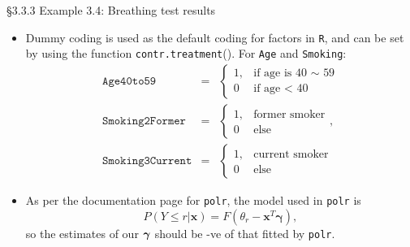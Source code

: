 \documentclass{beamer}
\newcommand{\boldgamma}{{\boldsymbol \gamma}}
\begin{document}
\begin{frame}{\S3.3.3 Example 3.4: Breathing test results  }
\begin{itemize}

\item
Dummy coding is used as the default coding for factors in \texttt{R}, and  can be set by using the function \texttt{contr.treatment}(). For  \texttt{Age} and \texttt{Smoking}:
{\footnotesize
\begin{eqnarray*}
\texttt{Age40to59}&=& \left\{\begin{array}{cc} 1, & \mbox{if age is 40 $\sim$ 59} \\ 0 & \mbox{if age < 40}
\end{array}\right. \\
\texttt{Smoking2Former}&=&\left\{\begin{array}{cc} 1, & \mbox{former smoker} \\ 0 & \mbox{else}
\end{array}\right.,\\
\texttt{Smoking3Current}&=&\left\{\begin{array}{cc} 1, & \mbox{current smoker} \\ 0 & \mbox{else}
\end{array}\right.
\end{eqnarray*}}
\item  As per the documentation page for \texttt{polr}, the model used in \texttt{polr} is 
\[
P(Y\leq r|\textbf{x})=F(\theta_r-\textbf{x}^T\boldgamma),
\] so the estimates of our $\mbox{\boldmath $\gamma$}$ should be -ve of that fitted by \texttt{polr}.
\end{itemize}
\end{frame}
\end{document}
